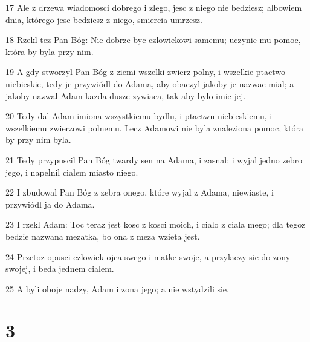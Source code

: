 \par 17 Ale z drzewa wiadomosci dobrego i zlego, jesc z niego nie bedziesz; albowiem dnia, którego jesc bedziesz z niego, smiercia umrzesz.
\par 18 Rzekl tez Pan Bóg: Nie dobrze byc czlowiekowi samemu; uczynie mu pomoc, która by byla przy nim.
\par 19 A gdy stworzyl Pan Bóg z ziemi wszelki zwierz polny, i wszelkie ptactwo niebieskie, tedy je przywiódl do Adama, aby obaczyl jakoby je nazwac mial; a jakoby nazwal Adam kazda dusze zywiaca, tak aby bylo imie jej.
\par 20 Tedy dal Adam imiona wszystkiemu bydlu, i ptactwu niebieskiemu, i wszelkiemu zwierzowi polnemu. Lecz Adamowi nie byla znaleziona pomoc, która by przy nim byla.
\par 21 Tedy przypuscil Pan Bóg twardy sen na Adama, i zasnal; i wyjal jedno zebro jego, i napelnil cialem miasto niego.
\par 22 I zbudowal Pan Bóg z zebra onego, które wyjal z Adama, niewiaste, i przywiódl ja do Adama.
\par 23 I rzekl Adam: Toc teraz jest kosc z kosci moich, i cialo z ciala mego; dla tegoz bedzie nazwana mezatka, bo ona z meza wzieta jest.
\par 24 Przetoz opusci czlowiek ojca swego i matke swoje, a przylaczy sie do zony swojej, i beda jednem cialem.
\par 25 A byli oboje nadzy, Adam i zona jego; a nie wstydzili sie.

\chapter{3}

